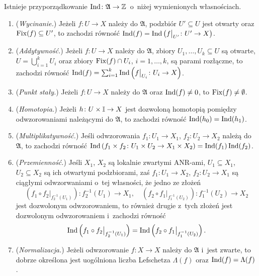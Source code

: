 \begin{tw}\label{tw-granasa-o-indeksie}
Istnieje przyporządkowanie $\operatorname{Ind}\colon \mathfrak{A}\to \mathbb{Z}$~o~niżej wymienionych własnościach.
\begin{enumerate}[\normalfont (I)]\label{aksjomaty_indeksu}
\item (\textit{Wycinanie.}) Jeżeli $f\colon U\to X$ należy do $\mathfrak{A}$, podzbiór $U'\subseteq U$ jest otwarty oraz $\operatorname{Fix}(f)\subseteq U'$, to zachodzi równość $\operatorname{Ind}(f)=\operatorname{Ind}\left(f\big |_{U'}\colon U'\to X\right)$.
\item (\textit{Addytywność.}) Jeżeli $f\colon U\to X$ należy do $\mathfrak{A}$, zbiory $U_1,\ldots,U_k\subseteq U$ są otwarte, $U=\bigcup_{i=1}^{k} U_i$ oraz zbiory $\operatorname{Fix}(f)\cap U_i$, $i=1,\ldots,k$, są parami rozłączne, to zachodzi równość $\operatorname{Ind}(f)=\sum_{i=1}^{k}\operatorname{Ind}\left(f\big |_{U_i}\colon U_i\to X\right)$.
\item (\textit{Punkt stały.}) Jeżeli $f\colon U\to X$ należy do $\mathfrak{A}$ oraz $\operatorname{Ind}(f)\not=0$, to $\operatorname{Fix}(f)\not=\emptyset$.
\item (\textit{Homotopia.}) Jeżeli $h\colon U\times \mathbb{I}\to X$ jest dozwoloną homotopią pomiędzy odwzorowaniami należącymi do $\mathfrak{A}$, to zachodzi równość $\operatorname{Ind}(h_0)=\operatorname{Ind}(h_1)$.
\item (\textit{Multiplikatywność.}) Jeśli odwzorowania $f_1\colon U_1\to X_1$, $f_2\colon U_2\to X_2$ należą do $\mathfrak{A}$, to zachodzi równość $\operatorname{Ind}\left(f_1\times f_2\colon U_1\times U_2\to X_1\times X_2\right)=\operatorname{Ind}(f_1)\operatorname{Ind}(f_2)$.
\item (\textit{Przemienność.}) Jeśli $X_1$, $X_2$ są lokalnie zwartymi ANR-ami, $U_1\subseteq X_1$, $U_2\subseteq X_2$ są ich otwartymi podzbiorami, zaś $f_1\colon U_1\to X_2$, $f_2\colon U_2\to X_1$ są ciągłymi odwzorwaniami o~tej własności, że jedno ze złożeń \[\left(f_1\circ f_2\big|_{f_2^{-1}(U_1)}\right)\colon f_2^{-1}(U_1)\to X_1,\quad \left(f_2\circ f_1\big|_{f_1^{-1}(U_2)}\right)\colon f_1^{-1}(U_2)\to X_2\] jest dozwolonym odwzorowaniem, to również drugie z~tych złożeń jest dozwolonym odwzorowaniem i~zachodzi równość \[\operatorname{Ind}\left(f_1\circ f_2\big|_{f_2^{-1}(U_1)}\right)=\operatorname{Ind}\left(f_2\circ f_1\big|_{f_1^{-1}(U_2)}\right).\]
\item (\textit{Normalizacja.}) Jeżeli odwzorowanie $f\colon X\to X$ należy do $\mathfrak{A}$ i~jest zwarte, to dobrze określona jest uogólniona liczba Lefschetza $\Lambda(f)$ oraz $\operatorname{Ind}(f)=\Lambda(f)$.
\end{enumerate}
\end{tw}

